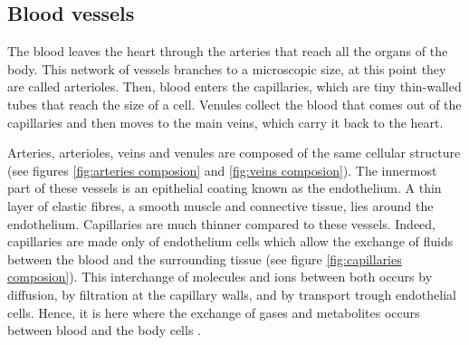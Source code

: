 \subsection{Blood vessels}
The blood leaves the heart through the arteries that reach all the organs of the body. This network of vessels branches to a microscopic size, at this point they are called arterioles. Then, blood enters the capillaries, which are tiny thin-walled tubes that reach the size of a cell. Venules collect the blood that comes out of the capillaries and then moves to the main veins, which carry it back to the heart.

Arteries, arterioles, veins and venules are composed of the same cellular structure (see figures \ref{fig:arteries composion} and \ref{fig:veins composion}). The innermost part of these vessels is an epithelial coating known as the endothelium. A thin layer of elastic fibres, a smooth muscle and connective tissue, lies around the endothelium. Capillaries are much thinner compared to these vessels. Indeed, capillaries are made only of endothelium cells which allow the exchange of fluids between the blood and the surrounding tissue (see figure \ref{fig:capillaries composion}). This interchange of molecules and ions between both occurs by diffusion, by filtration at the capillary walls, and by transport trough endothelial cells. Hence, it is here where the exchange of gases and metabolites occurs between blood and the body cells \cite{johnson2001biology}.


